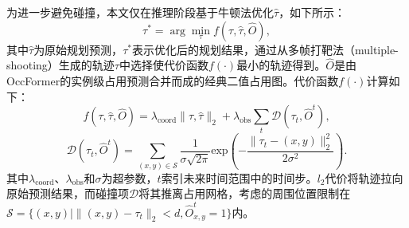 \documentclass[10pt,twocolumn,letterpaper]{article}
\begin{document}
为进一步避免碰撞，本文仅在推理阶段基于牛顿法优化$\hat{\tau}$，如下所示：
\begin{equation}
\label{eq:plan-argmin}
    \tau^* = \arg \min _{\tau} f(\tau, \hat{\tau}, \hat{O} ),
\end{equation}
其中$\hat{\tau}$为原始规划预测，$\tau^*$表示优化后的规划结果，通过从多帧打靶法（multiple-shooting）\cite{bock1984multiple}生成的轨迹$\tau$中选择使代价函数$f(\cdot)$最小的轨迹得到。$\hat{O}$是由OccFormer的实例级占用预测合并而成的经典二值占用图。代价函数$f(\cdot)$计算如下：
%
\begin{equation}
\label{eq:col-cost}
    f(\tau, \hat{\tau}, \hat{O} ) = \lambda_{\text{coord}}  \lVert\tau, \hat{\tau}\rVert_2 +
    \lambda_{\text{obs}}  \sum_{t} \mathcal{D}(\tau_{t}, \hat{O}^{t}),
\end{equation}
\vspace{-10pt}
\begin{equation}
\label{eq:col-dist}
    \mathcal{D}(\tau_{t}, \hat{O}^{t}) = \sum_{(x, y) \in \mathcal{S}}
    \frac{1}{\sigma \sqrt{2\pi}}
    \text{exp} (-\frac{\lVert \tau_{t} - (x, y) \rVert_2^2}{2\sigma^2}).
\end{equation}
%
其中$\lambda_{\text{coord}}$、$\lambda_{\text{obs}}$和$\sigma$为超参数，$t$索引未来时间范围中的时间步。$l_2$代价将轨迹拉向原始预测结果，而碰撞项$\mathcal{D}$将其推离占用网格，考虑的周围位置限制在$ \mathcal{S}=\{(x, y) | \lVert(x, y) - \tau_t\rVert_{2} < d, \hat{O}_{x, y}^t = 1\}$内。
\end{document}
